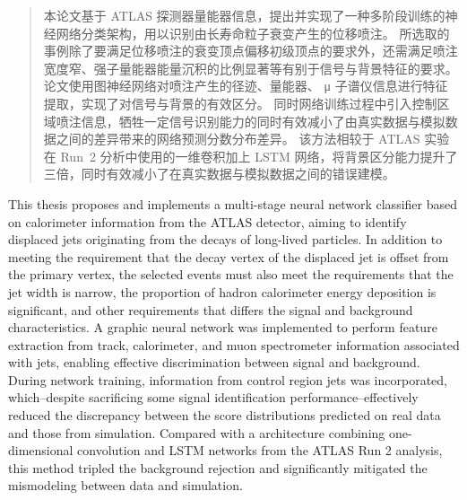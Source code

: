 

\begin{abstract}
  本论文基于 ATLAS 探测器量能器信息，提出并实现了一种多阶段训练的神经网络分类架构，用以识别由长寿命粒子衰变产生的位移喷注。
  所选取的事例除了要满足位移喷注的衰变顶点偏移初级顶点的要求外，还需满足喷注宽度窄、强子量能器能量沉积的比例显著等有别于信号与背景特征的要求。
  论文使用图神经网络对喷注产生的径迹、量能器、 μ 子谱仪信息进行特征提取，实现了对信号与背景的有效区分。
  同时网络训练过程中引入控制区域喷注信息，牺牲一定信号识别能力的同时有效减小了由真实数据与模拟数据之间的差异带来的网络预测分数分布差异。
  该方法相较于 ATLAS 实验在 Run~2 分析中使用的一维卷积加上 LSTM 网络，将背景区分能力提升了三倍，同时有效减小了在真实数据与模拟数据之间的错误建模。
\end{abstract}

\begin{abstract*}
  This thesis proposes and implements a multi-stage neural network classifier based on calorimeter information from the ATLAS detector, aiming to identify displaced jets originating from the decays of long-lived particles.
  In addition to meeting the requirement that the decay vertex of the displaced jet is offset from the primary vertex, the selected events must also meet the requirements that the jet width is narrow, the proportion of hadron calorimeter energy deposition is significant, and other requirements that differs the signal and background characteristics.
  A graphic neural network was implemented to perform feature extraction from track, calorimeter, and muon spectrometer information associated with jets, enabling effective discrimination between signal and background.
  During network training, information from control region jets was incorporated, which--despite sacrificing some signal identification performance--effectively reduced the discrepancy between the score distributions predicted on real data and those from simulation.
  Compared with a architecture combining one-dimensional convolution and LSTM networks from the ATLAS Run 2 analysis, this method tripled the background rejection and significantly mitigated the mismodeling between data and simulation.
\end{abstract*}
